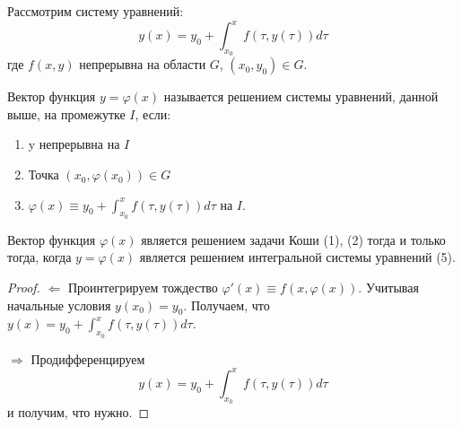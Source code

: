 \documentclass[document.tex]{subfiles}
\begin{document}
Рассмотрим систему уравнений:
$$y(x) = y_0 + \int_{x_0}^x f(\tau, y(\tau))d\tau$$
где $f(x, y)$ непрерывна на области $G$, $(x_0, y_0) \in G$.

\begin{definition}
Вектор функция $y = \varphi(x)$ называется решением системы уравнений, данной выше, на промежутке $I$, если:
\begin{enumerate}
\item y непрерывна на $I$
\item Точка $(x_0, \varphi(x_0)) \in G$
\item $\varphi(x) \equiv y_0 + \int_{x_0}^x f(\tau, y(\tau))d\tau$ на $I$.
\end{enumerate}
\end{definition}

\begin{lemma}[об эквивалентности]
Вектор функция $\varphi(x)$ является решением задачи Коши (1), (2) тогда и только тогда, когда $y = \varphi(x)$ является решением интегральной системы уравнений (5).
\end{lemma}
\begin{proof}
$\Leftarrow$ Проинтегрируем тождество $\varphi'(x) \equiv f(x, \varphi(x))$. Учитывая начальные условия $y(x_0) = y_0$. Получаем, что $y(x) = y_0 + \int_{x_0}^x f(\tau, y(\tau)) d\tau$.

$\Rightarrow$ Продифференцируем 
$$y(x) = y_0 + \int_{x_0}^x f(\tau, y(\tau))d\tau$$
и получим, что нужно.
\end{proof}
\end{document}
